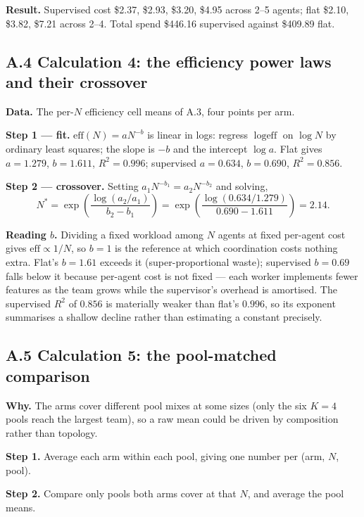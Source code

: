 \documentclass[11pt,a4paper]{article}
\begin{document}
\textbf{Result.} Supervised cost \$2.37, \$2.93, \$3.20, \$4.95 across 2--5 agents; flat \$2.10, \$3.82, \$7.21 across 2--4. Total spend \$446.16 supervised against \$409.89 flat.

\subsection*{A.4 \quad Calculation 4: the efficiency power laws and their crossover}

\textbf{Data.} The per-$N$ efficiency cell means of A.3, four points per arm.

\textbf{Step 1 --- fit.} $\text{eff}(N) = a N^{-b}$ is linear in logs: regress $\log \text{eff}$ on $\log N$ by ordinary least squares; the slope is $-b$ and the intercept $\log a$. Flat gives $a = 1.279$, $b = 1.611$, $R^2 = 0.996$; supervised $a = 0.634$, $b = 0.690$, $R^2 = 0.856$.

\textbf{Step 2 --- crossover.} Setting $a_1 N^{-b_1} = a_2 N^{-b_2}$ and solving,
\[
N^{*} = \exp\!\left(\frac{\log(a_2/a_1)}{b_2 - b_1}\right) = \exp\!\left(\frac{\log(0.634/1.279)}{0.690 - 1.611}\right) = 2.14 .
\]

\textbf{Reading $b$.} Dividing a fixed workload among $N$ agents at fixed per-agent cost gives $\text{eff} \propto 1/N$, so $b = 1$ is the reference at which coordination costs nothing extra. Flat's $b = 1.61$ exceeds it (super-proportional waste); supervised $b = 0.69$ falls below it because per-agent cost is not fixed --- each worker implements fewer features as the team grows while the supervisor's overhead is amortised. The supervised $R^2$ of $0.856$ is materially weaker than flat's $0.996$, so its exponent summarises a shallow decline rather than estimating a constant precisely.

\subsection*{A.5 \quad Calculation 5: the pool-matched comparison}

\textbf{Why.} The arms cover different pool mixes at some sizes (only the six $K=4$ pools reach the largest team), so a raw mean could be driven by composition rather than topology.

\textbf{Step 1.} Average each arm within each pool, giving one number per (arm, $N$, pool).

\textbf{Step 2.} Compare only pools both arms cover at that $N$, and average the pool means.
\end{document}
